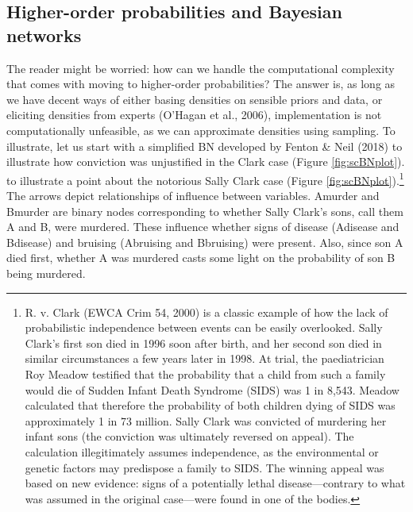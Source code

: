 \documentclass[
  10pt,
  dvipsnames,enabledeprecatedfontcommands]{scrartcl}
\begin{document}
\hypertarget{higher-order-probabilities-and-bayesian-networks}{%
\subsection{Higher-order probabilities and Bayesian
networks}\label{higher-order-probabilities-and-bayesian-networks}}

The reader might be worried: how can we handle the computational
complexity that comes with moving to higher-order probabilities? The
answer is, as long as we have decent ways of either basing densities on
sensible priors and data, or eliciting densities from experts (O'Hagan
et al., 2006), implementation is not computationally unfeasible, as we
can approximate densities using sampling. To illustrate, let us start
with a simplified BN developed by Fenton \& Neil (2018) to illustrate
how conviction was unjustified in the Clark case (Figure
\ref{fig:scBNplot}). to illustrate a point about the notorious Sally
Clark case (Figure \ref{fig:scBNplot}).\footnote{R. v. Clark (EWCA Crim
  54, 2000) is a classic example of how the lack of probabilistic
  independence between events can be easily overlooked. Sally Clark's
  first son died in 1996 soon after birth, and her second son died in
  similar circumstances a few years later in 1998. At trial, the
  paediatrician Roy Meadow testified that the probability that a child
  from such a family would die of Sudden Infant Death Syndrome (SIDS)
  was 1 in 8,543. Meadow calculated that therefore the probability of
  both children dying of SIDS was approximately 1 in 73 million. Sally
  Clark was convicted of murdering her infant sons (the conviction was
  ultimately reversed on appeal). The calculation illegitimately assumes
  independence, as the environmental or genetic factors may predispose a
  family to SIDS. The winning appeal was based on new evidence: signs of
  a potentially lethal disease---contrary to what was assumed in the
  original case---were found in one of the bodies.} The arrows depict
relationships of influence between variables. \textsf{Amurder} and
\textsf{Bmurder} are binary nodes corresponding to whether Sally Clark's
sons, call them A and B, were murdered. These influence whether signs of
disease (\textsf{Adisease} and \textsf{Bdisease}) and bruising
(\textsf{Abruising} and \textsf{Bbruising}) were present. Also, since
son A died first, whether A was murdered casts some light on the
probability of son B being murdered.
\end{document}
